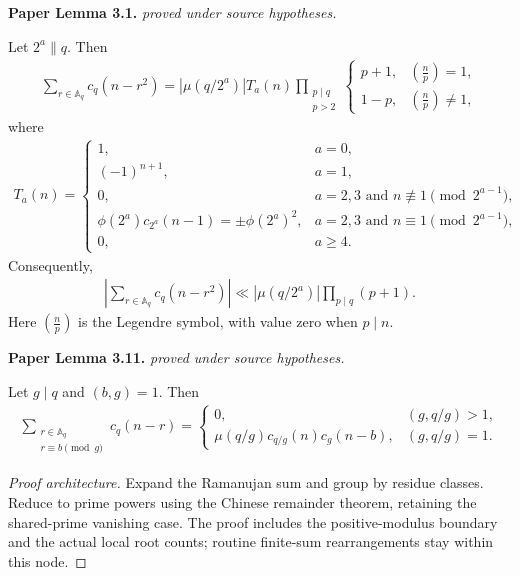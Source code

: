 \begin{lemma}
\label{cohen_identities}
\leanok
\par\medskip\noindent\textbf{Paper Lemma 3.1.} \textit{proved under source hypotheses.}\par
Let $2^a\parallel q$.  Then
\begin{align}
 \sum_{r\in\mathbb A_q}c_q(n-r^2)
 =|\mu(q/2^a)| T_a(n)
 \prod_{\substack{p\mid q\\p>2}}
 \begin{cases}
  p+1,&\left(\frac np\right)=1,\\
  1-p,&\left(\frac np\right)\ne1,
 \end{cases}
\end{align}
where
\begin{align}
 T_a(n)=
 \begin{cases}
  1,&a=0,\\
  (-1)^{n+1},&a=1,\\
  0,&a=2,3\text{ and }n\not\equiv1\pmod{2^{a-1}},\\
  \phi(2^a)c_{2^a}(n-1)=\pm\phi(2^a)^2,
    &a=2,3\text{ and }n\equiv1\pmod{2^{a-1}},\\
  0,&a\geq4.
 \end{cases}
\end{align}
Consequently,
\begin{align}
 \left|\sum_{r\in\mathbb A_q}c_q(n-r^2)\right|
 \ll |\mu(q/2^a)|\prod_{p\mid q}(p+1).
\end{align}
Here $(\frac np)$ is the Legendre symbol, with value zero when $p\mid n$.
\par\medskip\noindent\textbf{Paper Lemma 3.11.} \textit{proved under source hypotheses.}\par
Let $g\mid q$ and $(b,g)=1$. Then
\begin{align}
 \sum_{\substack{r\in\mathbb A_q\\r\equiv b\pmod g}}c_q(n-r)
 =
 \begin{cases}
  0,&(g,q/g)>1,\\
  \mu(q/g)c_{q/g}(n)c_g(n-b),&(g,q/g)=1.
 \end{cases}
\end{align}
\end{lemma}
\begin{proof}[Proof architecture]
\leanok
Expand the Ramanujan sum and group by residue classes. Reduce to prime powers using the Chinese remainder theorem, retaining the shared-prime vanishing case. The proof includes the positive-modulus boundary and the actual local root counts; routine finite-sum rearrangements stay within this node.
\end{proof}

